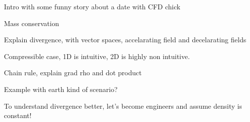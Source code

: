 \documentclass{article}
\begin{document}
Intro with some funny story about a date with CFD chick

Mass conservation

Explain divergence, with vector spaces, accelarating field and decelarating fields

Compressible case, 1D is intuitive, 2D is highly non intuitive.

Chain rule, explain grad rho and dot product

Example with earth kind of scenario?



To understand divergence better, let's become engineers and assume density is constant!
\end{document}
